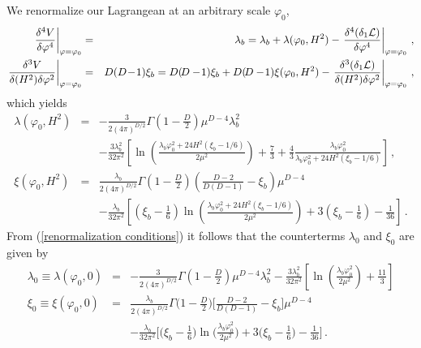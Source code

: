 We renormalize our Lagrangean at an arbitrary scale $\varphi_0$,
\begin{eqnarray}
\left.
\frac{\delta^4V}{\delta\varphi^4}\right|_{\varphi=\varphi_0} &=&
\lambda_b = \lambda_b + \lambda({\varphi_0},H^2) -
\left. \frac{\delta^4(\delta_1{\cal L})}{\delta\varphi^4}\right|_{\varphi=\varphi_0}\,,\nonumber\\
\left.
\frac{\delta^3V}{\delta(H^2)\delta\varphi^2}\right|_{\varphi=\varphi_0}
&=& D(D\!-\!1)\xi_b = D(\!D-\!1)\xi_b +
D(\!D-\!1)\xi(\varphi_0,H^2) - \left. \frac{\delta^3(\delta_1{\cal
L})}{\delta(H^2)\delta\varphi^2}\right|_{\varphi=\varphi_0}\,,
\label{renormalization conditions}
\end{eqnarray}
which yields
\begin{eqnarray}
\lambda({\varphi_0},H^2) &=&
-\frac{3}{2(4\pi)^{D/2}}\Gamma(1-\frac{D}{2})\mu^{D-4}\lambda_b^2
\nonumber
\\
& &
-\frac{3\lambda_b^2}{32\pi^2}\left[\ln\left(\frac{\lambda_b\varphi_0^2+24H^2(\xi_b-1/6)}{{2\mu^2}}\right)
+\frac73 +
\frac43\frac{\lambda_b\varphi_0^2}{\lambda_b\varphi_0^2+24H^2(\xi_b-1/6)}
\right]
\,,
\nonumber\\
\xi(\varphi_0,H^2)
  &=&\frac{\lambda_b}{2(4\pi)^{D/2}}
           \Gamma(1-\frac{D}{2})\left(\frac{D-2}{D(D-1)}-\xi_b\right)\mu^{D-4}
\nonumber\\
    & &-\frac{\lambda_b}{32\pi^2}\left[\left(\xi_b-\frac16\right)\ln\left(
    \frac{\lambda_b\varphi_0^2+24H^2(\xi_b-1/6)}{{2\mu^2}}\right)
         +3\left(\xi_b-\frac16\right)-\frac{1}{36}\right]
\,.
\end{eqnarray}
From (\ref{renormalization conditions}) it follows that the
counterterms $\lambda_0$ and $\xi_0$ are given by
\begin{eqnarray}
\lambda_0 \equiv \lambda({\varphi_0},0) &=&
-\frac{3}{2(4\pi)^{D/2}}\Gamma\left(1-\frac{D}{2}\right)\mu^{D-4}\lambda_b^2
-\frac{3\lambda_b^2}{32\pi^2}\left[\ln\left(\frac{\lambda_b\varphi_0^2}{2\mu^2}\right)+\frac{11}{3}\right]\nonumber\\
\xi_0 \equiv \xi({\varphi_0},0) &=&
\frac{\lambda_b}{2(4\pi)^{D/2}}
                \Gamma\Big(1-\frac{D}{2}\Big)
                       \bigg[\frac{D\!-\!2}{D(D-1)}-\xi_b\bigg]
                       \mu^{D-4}
\nonumber\\
         & & -\frac{\lambda_b}{32\pi^{2}}\bigg[\Big(\xi_b-\frac{1}{6}\Big)
                       \ln\Big(\frac{\lambda_b\varphi_0^{2}}{2\mu^{2}}\Big)
                       +3\Big(\xi_b-\frac{1}{6}\Big)-\frac{1}{36}\bigg]
\,.
\label{counterterms}
\end{eqnarray}
